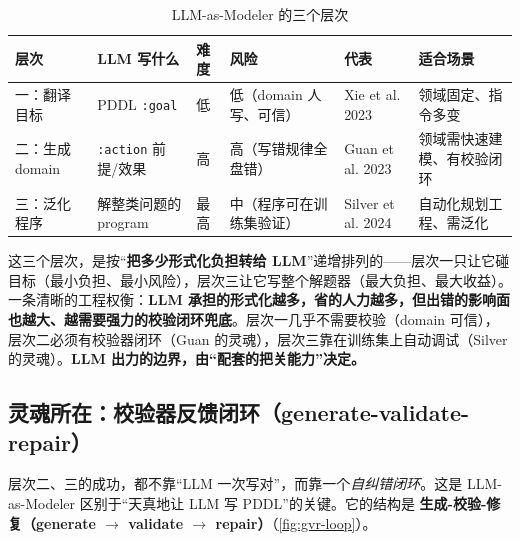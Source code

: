 \begin{table}[H]\centering\small
\caption{LLM-as-Modeler 的三个层次}
\label{tab:modeler-levels}
\begin{tabular}{p{1.6cm}p{2.6cm}p{1.0cm}p{2.8cm}p{2.0cm}p{2.6cm}}
\toprule
层次 & LLM 写什么 & 难度 & 风险 & 代表 & 适合场景 \\
\midrule
一：翻译目标 & PDDL \texttt{:goal} & 低 & 低（domain 人写、可信） & Xie et al. 2023 & 领域固定、指令多变 \\
二：生成 domain & \texttt{:action} 前提/效果 & 高 & 高（写错规律全盘错） & Guan et al. 2023 & 领域需快速建模、有校验闭环 \\
三：泛化程序 & 解整类问题的 program & 最高 & 中（程序可在训练集验证） & Silver et al. 2024 & 自动化规划工程、需泛化 \\
\bottomrule
\end{tabular}
\end{table}

\begin{insight}
这三个层次，是按“\textbf{把多少形式化负担转给 LLM}”递增排列的——层次一只让它碰目标（最小负担、最小风险），层次三让它写整个解题器（最大负担、最大收益）。一条清晰的工程权衡：\textbf{LLM 承担的形式化越多，省的人力越多，但出错的影响面也越大、越需要强力的校验闭环兜底}。层次一几乎不需要校验（domain 可信），层次二必须有校验器闭环（Guan 的灵魂），层次三靠在训练集上自动调试（Silver 的灵魂）。\textbf{LLM 出力的边界，由“配套的把关能力”决定。}
\end{insight}

\subsection{灵魂所在：校验器反馈闭环（generate-validate-repair）}
\label{sec:modeler-loop}

层次二、三的成功，都不靠“LLM 一次写对”，而靠一个\emph{自纠错闭环}。这是 LLM-as-Modeler 区别于“天真地让 LLM 写 PDDL”的关键。它的结构是 \textbf{生成-校验-修复（generate $\to$ validate $\to$ repair）}（\cref{fig:gvr-loop}）。

